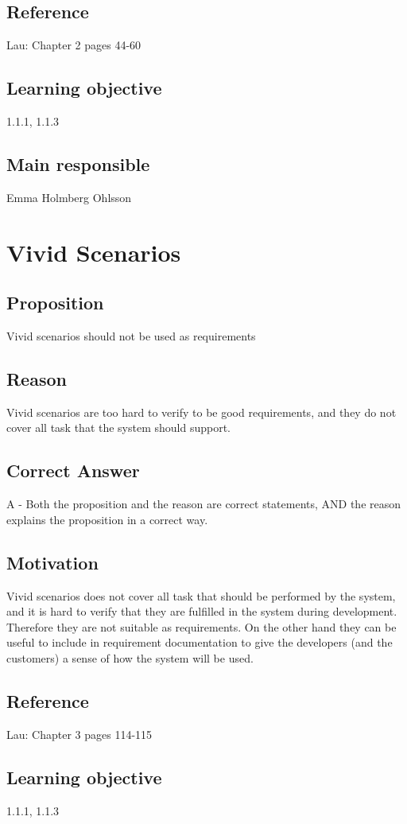 \documentclass[a4paper]{article}
\begin{document}
\subsection*{Reference}
Lau: Chapter 2 pages 44-60
\subsection*{Learning objective}
1.1.1, 1.1.3
\subsection*{Main responsible}
Emma Holmberg Ohlsson


\section{Vivid Scenarios}
\subsection*{Proposition}
Vivid scenarios should not be used as requirements
\subsection*{Reason}
Vivid scenarios are too hard to verify to be good requirements, and they do not cover all task that the system should support.
\subsection*{Correct Answer}
A - Both the proposition and the reason are correct statements, AND the reason explains the proposition in a correct way.
\subsection*{Motivation}
Vivid scenarios does not cover all task that should be performed by the system, and it is hard to verify that they are fulfilled in the system during development. Therefore they are not suitable as requirements. On the other hand they can be useful to include in requirement documentation to give the developers (and the customers) a sense of how the system will be used.
\subsection*{Reference}
Lau: Chapter 3 pages 114-115
\subsection*{Learning objective}
1.1.1, 1.1.3
\end{document}
